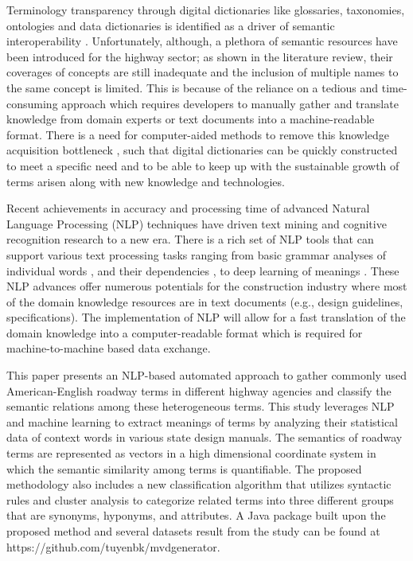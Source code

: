 \documentclass[Journal, BackFigs,NoLists, DoubleSpace]{ascelike}%
\begin{document}
Terminology transparency through digital dictionaries like glossaries, taxonomies, ontologies and data dictionaries is identified as a driver of semantic interoperability \cite{ouksel99}. Unfortunately, although, a plethora of semantic resources have been introduced for the highway sector; as shown in the literature review, their coverages of concepts are still inadequate and the inclusion of multiple names to the same concept is limited. This is because of the reliance on a tedious and time-consuming approach which requires developers to manually gather and translate knowledge from domain experts or text documents into a machine-readable format. There is a need for computer-aided methods to remove this knowledge acquisition bottleneck \cite{mounce10}, such that digital dictionaries can be quickly constructed to meet a specific need and to be able to keep up with the sustainable growth of terms arisen along with new knowledge and technologies.
\par
Recent achievements in accuracy and processing time of advanced Natural Language Processing (NLP) techniques have driven text mining and cognitive recognition research to a new era. There is a rich set of NLP tools that can support various text processing tasks ranging from basic grammar analyses of individual words \cite{Toutanova03,Cunningham02}, and their dependencies \cite{chen14}, to deep learning of meanings \cite{mikolov13a,pennington2014glove}. These NLP advances offer numerous potentials for the construction industry where most of the domain knowledge resources are in text documents (e.g., design guidelines, specifications). The implementation of NLP will allow for a fast translation of the domain knowledge into a computer-readable format which is required for machine-to-machine based data exchange.
\par
This paper presents an NLP-based automated approach to gather commonly used American-English roadway terms in different highway agencies and classify the semantic relations among these heterogeneous terms. This study leverages NLP and machine learning to extract meanings of terms by analyzing their statistical data of context words in various state design manuals. The semantics of roadway terms are represented as vectors in a high dimensional coordinate system in which the semantic similarity among terms is quantifiable. The proposed methodology also includes a new classification algorithm that utilizes syntactic rules and cluster analysis to categorize related terms into three different groups that are synonyms, hyponyms, and attributes. A Java package built upon the proposed method and several datasets result from the study can be found at https://github.com/tuyenbk/mvdgenerator. 
% 
\end{document}
